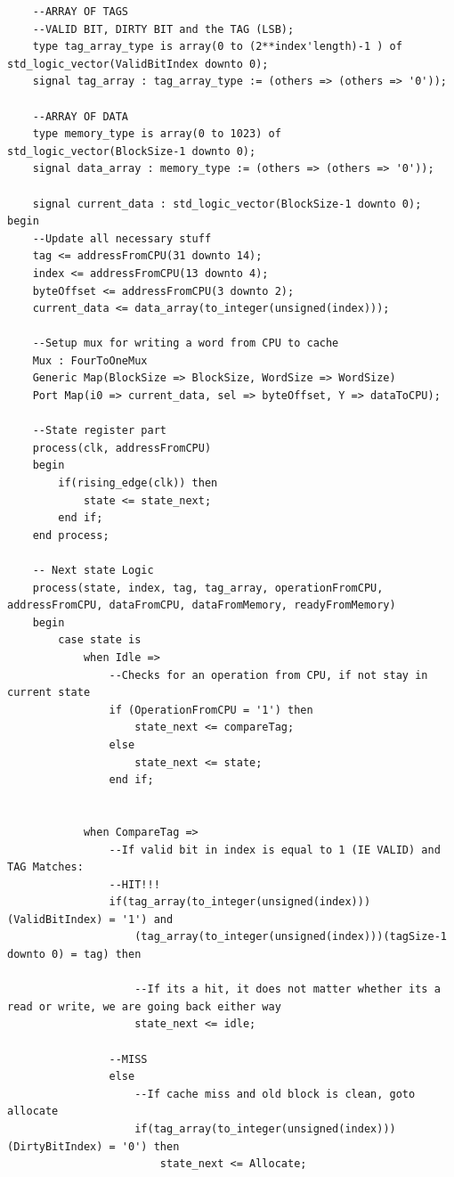\documentclass{article}
\begin{document}
\begin{lstlisting}
    --ARRAY OF TAGS
    --VALID BIT, DIRTY BIT and the TAG (LSB);
    type tag_array_type is array(0 to (2**index'length)-1 ) of std_logic_vector(ValidBitIndex downto 0);
    signal tag_array : tag_array_type := (others => (others => '0'));

    --ARRAY OF DATA
    type memory_type is array(0 to 1023) of std_logic_vector(BlockSize-1 downto 0);
    signal data_array : memory_type := (others => (others => '0'));

    signal current_data : std_logic_vector(BlockSize-1 downto 0);
begin
    --Update all necessary stuff
    tag <= addressFromCPU(31 downto 14);
    index <= addressFromCPU(13 downto 4);
    byteOffset <= addressFromCPU(3 downto 2);
    current_data <= data_array(to_integer(unsigned(index)));

    --Setup mux for writing a word from CPU to cache
    Mux : FourToOneMux
    Generic Map(BlockSize => BlockSize, WordSize => WordSize)
    Port Map(i0 => current_data, sel => byteOffset, Y => dataToCPU);

    --State register part
    process(clk, addressFromCPU)
    begin
        if(rising_edge(clk)) then
            state <= state_next;
        end if;
    end process;

    -- Next state Logic
    process(state, index, tag, tag_array, operationFromCPU, addressFromCPU, dataFromCPU, dataFromMemory, readyFromMemory)
    begin
        case state is
            when Idle =>
                --Checks for an operation from CPU, if not stay in current state
                if (OperationFromCPU = '1') then
                    state_next <= compareTag;
                else
                    state_next <= state;
                end if;


            when CompareTag =>
                --If valid bit in index is equal to 1 (IE VALID) and TAG Matches:
                --HIT!!!
                if(tag_array(to_integer(unsigned(index)))(ValidBitIndex) = '1') and
                    (tag_array(to_integer(unsigned(index)))(tagSize-1 downto 0) = tag) then

                    --If its a hit, it does not matter whether its a read or write, we are going back either way
                    state_next <= idle;

                --MISS
                else
                    --If cache miss and old block is clean, goto allocate
                    if(tag_array(to_integer(unsigned(index)))(DirtyBitIndex) = '0') then
                        state_next <= Allocate;


\end{lstlisting}
\end{document}
